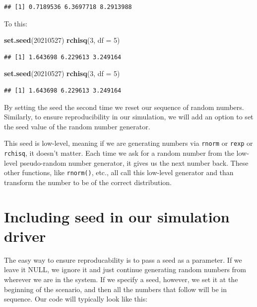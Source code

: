 \documentclass[
]{book}
\newenvironment{Shaded}{\begin{snugshade}}{\end{snugshade}}
\newcommand{\AttributeTok}[1]{\textcolor[rgb]{0.13,0.29,0.53}{#1}}
\newcommand{\DecValTok}[1]{\textcolor[rgb]{0.00,0.00,0.81}{#1}}
\newcommand{\FunctionTok}[1]{\textcolor[rgb]{0.13,0.29,0.53}{\textbf{#1}}}
\newcommand{\NormalTok}[1]{#1}
\begin{document}
\begin{verbatim}
## [1] 0.7189536 6.3697718 8.2913988
\end{verbatim}

To this:

\begin{Shaded}
\begin{Highlighting}[]
\FunctionTok{set.seed}\NormalTok{(}\DecValTok{20210527}\NormalTok{)}
\FunctionTok{rchisq}\NormalTok{(}\DecValTok{3}\NormalTok{, }\AttributeTok{df =} \DecValTok{5}\NormalTok{)}
\end{Highlighting}
\end{Shaded}

\begin{verbatim}
## [1] 1.643698 6.229613 3.249164
\end{verbatim}

\begin{Shaded}
\begin{Highlighting}[]
\FunctionTok{set.seed}\NormalTok{(}\DecValTok{20210527}\NormalTok{)}
\FunctionTok{rchisq}\NormalTok{(}\DecValTok{3}\NormalTok{, }\AttributeTok{df =} \DecValTok{5}\NormalTok{)}
\end{Highlighting}
\end{Shaded}

\begin{verbatim}
## [1] 1.643698 6.229613 3.249164
\end{verbatim}

By setting the seed the second time we reset our sequence of random numbers.
Similarly, to ensure reproducibility in our simulation, we will add an option to set the seed value of the random number generator.

This seed is low-level, meaning if we are generating numbers via \texttt{rnorm} or \texttt{rexp} or \texttt{rchisq}, it doesn't matter.
Each time we ask for a random number from the low-level pseudo-random number generator, it gives us the next number back.
These other functions, like \texttt{rnorm()}, etc., all call this low-level generator and than transform the number to be of the correct distribution.

\section{Including seed in our simulation driver}\label{including-seed-in-our-simulation-driver}

The easy way to ensure reproducability is to pass a seed as a parameter.
If we leave it NULL, we ignore it and just continue generating random numbers from wherever we are in the system.
If we specify a seed, however, we set it at the beginning of the scenario, and then all the numbers that follow will be in sequence.
Our code will typically look like this:
\end{document}
